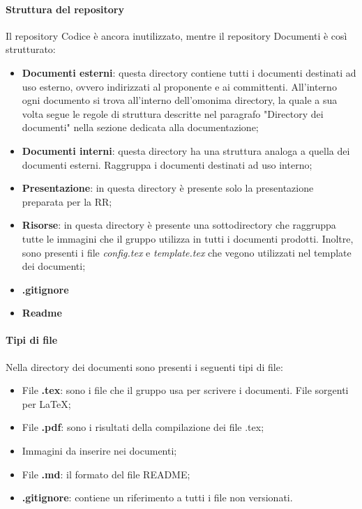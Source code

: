 \documentclass[../norme_di_progetto.tex]{subfiles}
\begin{document}
\paragraph{Struttura del repository}
Il repository Codice è ancora inutilizzato, mentre il repository Documenti è così strutturato:
\begin{itemize}
    \item \textbf{Documenti esterni}: questa directory contiene tutti i documenti destinati ad uso esterno, ovvero indirizzati al proponente e ai committenti. All'interno ogni documento si trova all'interno dell'omonima directory, la quale a sua volta segue le regole di struttura descritte nel paragrafo "Directory dei documenti" nella sezione dedicata alla documentazione;
    \item \textbf{Documenti interni}: questa directory ha una struttura analoga a quella dei documenti esterni. Raggruppa i documenti destinati ad uso interno;
    \item \textbf{Presentazione}: in questa directory è presente solo la presentazione preparata per la RR;
    \item \textbf{Risorse}: in questa directory è presente una sottodirectory che raggruppa tutte le immagini che il gruppo utilizza in tutti i documenti prodotti. Inoltre, sono presenti i file \emph{config.tex} e \emph{template.tex} che vegono utilizzati nel template dei documenti;
    \item \textbf{.gitignore}
    \item \textbf{Readme}
\end{itemize}

\paragraph{Tipi di file}
Nella directory dei documenti sono presenti i seguenti tipi di file:
\begin{itemize}
    \item File \textbf{.tex}: sono i file che il gruppo usa per scrivere i documenti. File sorgenti per \LaTeX;
    \item File \textbf{.pdf}: sono i risultati della compilazione dei file .tex;
    \item Immagini da inserire nei documenti;
    \item File \textbf{.md}: il formato del file README;
    \item \textbf{.gitignore}: contiene un riferimento a tutti i file non versionati.
\end{itemize}
\end{document}
